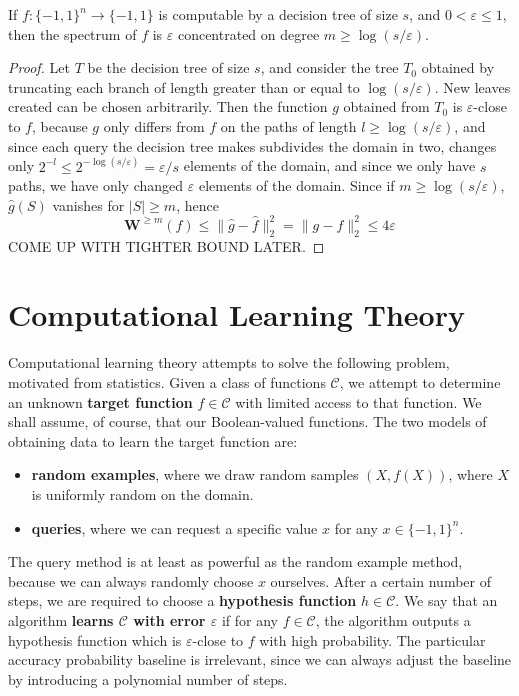 \begin{theorem}
    If $f: \{ -1, 1 \}^n \to \{ -1, 1 \}$ is computable by a decision tree of size $s$, and $0 < \varepsilon \leq 1$, then the spectrum of $f$ is $\varepsilon$ concentrated on degree $m \geq \log(s/\varepsilon)$.
\end{theorem}
\begin{proof}
    Let $T$ be the decision tree of size $s$, and consider the tree $T_0$ obtained by truncating each branch of length greater than or equal to $\log(s/\varepsilon)$. New leaves created can be chosen arbitrarily. Then the function $g$ obtained from $T_0$ is $\varepsilon$-close to $f$, because $g$ only differs from $f$ on the paths of length $l \geq \log(s/\varepsilon)$, and since each query the decision tree makes subdivides the domain in two, changes only $2^{-l} \leq 2^{-\log(s/\varepsilon)} = \varepsilon/s$ elements of the domain, and since we only have $s$ paths, we have only changed $\varepsilon$ elements of the domain. Since if $m \geq \log(s/\varepsilon)$, $\widehat{g}(S)$ vanishes for $|S| \geq m$, hence
    \[ \mathbf{W}^{\geq m}(f) \leq \| \widehat{g} - \widehat{f} \|_2^2 = \| g - f \|_2^2 \leq 4 \varepsilon \]
    COME UP WITH TIGHTER BOUND LATER.
\end{proof}




\section{Computational Learning Theory}

Computational learning theory attempts to solve the following problem, motivated from statistics. Given a class of functions $\mathcal{C}$, we attempt to determine an unknown {\bf target function} $f \in \mathcal{C}$ with limited access to that function. We shall assume, of course, that our Boolean-valued functions. The two models of obtaining data to learn the target function are:
%
\begin{itemize}
    \item {\bf random examples}, where we draw random samples $(X,f(X))$, where $X$ is uniformly random on the domain.
    \item {\bf queries}, where we can request a specific value $x$ for any $x \in \{ -1, 1 \}^n$.
\end{itemize}
%
The query method is at least as powerful as the random example method, because we can always randomly choose $x$ ourselves. After a certain number of steps, we are required to choose a {\bf hypothesis function} $h \in \mathcal{C}$. We say that an algorithm {\bf learns $\mathcal{C}$ with error $\varepsilon$} if for any $f \in \mathcal{C}$, the algorithm outputs a hypothesis function which is $\varepsilon$-close to $f$ with high probability. The particular accuracy probability baseline is irrelevant, since we can always adjust the baseline by introducing a polynomial number of steps.

